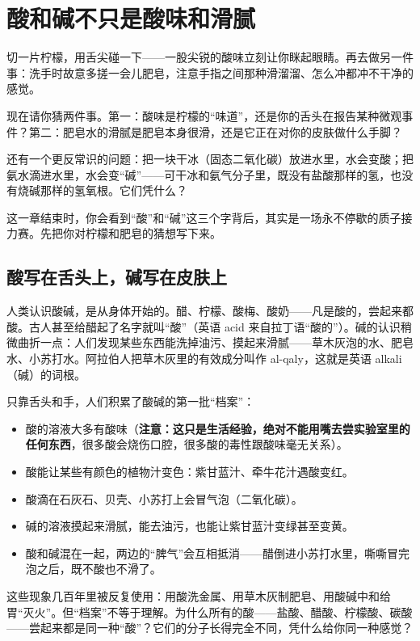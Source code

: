 \chapter{酸和碱不只是酸味和滑腻}

\begin{kaichang}
切一片柠檬，用舌尖碰一下——一股尖锐的酸味立刻让你眯起眼睛。再去做另一件事：洗手时故意多搓一会儿肥皂，注意手指之间那种滑溜溜、怎么冲都冲不干净的感觉。

现在请你猜两件事。第一：酸味是柠檬的“味道”，还是你的舌头在报告某种微观事件？第二：肥皂水的滑腻是肥皂本身很滑，还是它正在对你的皮肤做什么手脚？

还有一个更反常识的问题：把一块干冰（固态二氧化碳）放进水里，水会变酸；把氨水滴进水里，水会变“碱”——可干冰和氨气分子里，既没有盐酸那样的氢，也没有烧碱那样的氢氧根。它们凭什么？

这一章结束时，你会看到“酸”和“碱”这三个字背后，其实是一场永不停歇的质子接力赛。先把你对柠檬和肥皂的猜想写下来。
\end{kaichang}

\section{酸写在舌头上，碱写在皮肤上}

人类认识酸碱，是从身体开始的。醋、柠檬、酸梅、酸奶——凡是酸的，尝起来都酸。古人甚至给醋起了名字就叫“酸”（英语 acid 来自拉丁语“酸的”）。碱的认识稍微曲折一点：人们发现某些东西能洗掉油污、摸起来滑腻——草木灰泡的水、肥皂水、小苏打水。阿拉伯人把草木灰里的有效成分叫作 al-qaly，这就是英语 alkali（碱）的词根。

只靠舌头和手，人们积累了酸碱的第一批“档案”：

\begin{itemize}[itemsep=2pt]
\item 酸的溶液大多有酸味（\textbf{注意：这只是生活经验，绝对不能用嘴去尝实验室里的任何东西}，很多酸会烧伤口腔，很多酸的毒性跟酸味毫无关系）。
\item 酸能让某些有颜色的植物汁变色：紫甘蓝汁、牵牛花汁遇酸变红。
\item 酸滴在石灰石、贝壳、小苏打上会冒气泡（二氧化碳）。
\item 碱的溶液摸起来滑腻，能去油污，也能让紫甘蓝汁变绿甚至变黄。
\item 酸和碱混在一起，两边的“脾气”会互相抵消——醋倒进小苏打水里，嘶嘶冒完泡之后，既不酸也不滑了。
\end{itemize}

这些现象几百年里被反复使用：用酸洗金属、用草木灰制肥皂、用酸碱中和给胃“灭火”。但“档案”不等于理解。为什么所有的酸——盐酸、醋酸、柠檬酸、碳酸——尝起来都是同一种“酸”？它们的分子长得完全不同，凭什么给你同一种感觉？


